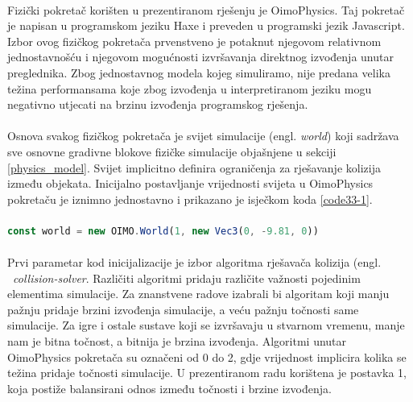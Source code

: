\documentclass[times, utf8, diplomski]{fer}
\begin{document}
\paragraph{}
Fizički pokretač korišten u prezentiranom rješenju je OimoPhysics. Taj pokretač je napisan
u programskom jeziku Haxe i preveden u programski jezik Javascript. Izbor ovog fizičkog 
pokretača prvenstveno je potaknut njegovom relativnom jednostavnošću i njegovom mogućnosti 
izvršavanja direktnog izvođenja unutar preglednika. Zbog jednostavnog modela kojeg 
simuliramo, nije predana velika težina performansama koje zbog izvođenja u interpretiranom
jeziku mogu negativno utjecati na brzinu izvođenja programskog rješenja.

\paragraph{}
Osnova svakog fizičkog pokretača je svijet simulacije (engl. \textit{world}) koji sadržava 
sve osnovne gradivne blokove fizičke simulacije objašnjene u sekciji \ref{physics_model}.
Svijet implicitno definira ograničenja za rješavanje kolizija između objekata. Inicijalno
postavljanje vrijednosti svijeta u OimoPhysics pokretaču je iznimno jednostavno i prikazano je isječkom koda \ref{code33-1}.
\paragraph{}

\begin{lstlisting}[language=Javascript,caption=Postavljanje simulacijskog svijeta, label=code33-1]
const world = new OIMO.World(1, new Vec3(0, -9.81, 0))
\end{lstlisting}

\paragraph{}
Prvi parametar kod inicijalizacije je izbor algoritma rješavača kolizija (engl. \
\textit{collision-solver}. Različiti algoritmi pridaju različite važnosti pojedinim 
elementima simulacije. Za znanstvene radove izabrali bi algoritam koji manju pažnju pridaje
brzini izvođenja simulacije, a veću pažnju točnosti same simulacije. Za igre i ostale 
sustave koji se izvršavaju u stvarnom vremenu, manje nam je bitna točnost, a bitnija je 
brzina izvođenja. Algoritmi unutar OimoPhysics pokretača su označeni od 0 do 2, gdje 
vrijednost implicira kolika se težina pridaje točnosti simulacije. U prezentiranom radu
korištena je postavka 1, koja postiže balansirani odnos između točnosti i brzine izvođenja.
\end{document}
